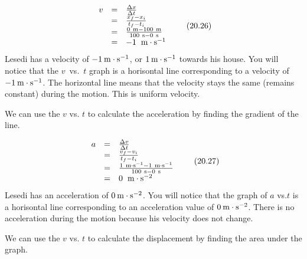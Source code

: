     \begin{equation}
    \begin{array}{ccc}\hfill v& =& \frac{\Delta x}{\Delta t}\hfill \\ & =& \frac{{x}_{f}-{x}_{i}}{{t}_{f}-{t}_{i}}\hfill \\ & =& \frac{0\phantom{\rule{3.33333pt}{0ex}}\mathrm{m}-100\phantom{\rule{3.33333pt}{0ex}}\mathrm{m}}{100\phantom{\rule{3.33333pt}{0ex}}\mathrm{s}-0\phantom{\rule{3.33333pt}{0ex}}\mathrm{s}}\hfill \\ & =& -1\phantom{\rule{4pt}{0ex}}\phantom{\rule{0.166667em}{0ex}}\mathrm{m}\ensuremath{\cdot}{\mathrm{s}}^{-1}\hfill \end{array}\tag{20.26}
      \end{equation}
        \label{m38795*id70472}Lesedi has a velocity of $-1\phantom{\rule{2pt}{0ex}}\mathrm{m}\ensuremath{\cdot}\mathrm{s}{}^{-1}$, or $1\phantom{\rule{2pt}{0ex}}\mathrm{m}\ensuremath{\cdot}\mathrm{s}{}^{-1}$ towards his house. You will notice that the $v$~vs.~$t$ graph is a horisontal line corresponding to a velocity of $-1\phantom{\rule{2pt}{0ex}}\mathrm{m}\ensuremath{\cdot}\mathrm{s}{}^{-1}$. The horizontal line means that the velocity stays the same (remains constant) during the motion. This is uniform velocity.\par 
        \label{m38795*id70573}We can use the $v$ vs. $t$ to calculate the acceleration by finding the gradient of the line.\par 
        \label{m38795*id70595}\nopagebreak\noindent{}
          
    \begin{equation}
    \begin{array}{ccc}\hfill a& =& \frac{\Delta v}{\Delta t}\hfill \\ & =& \frac{{v}_{f}-{v}_{i}}{{t}_{f}-{t}_{i}}\hfill \\ & =& \frac{1\phantom{\rule{3.33333pt}{0ex}}\mathrm{m}\ensuremath{\cdot}{\mathrm{s}}^{-1}-1\phantom{\rule{3.33333pt}{0ex}}\mathrm{m}\ensuremath{\cdot}{\mathrm{s}}^{-1}}{100\phantom{\rule{3.33333pt}{0ex}}\mathrm{s}-0\phantom{\rule{3.33333pt}{0ex}}\mathrm{s}}\hfill \\ & =& 0\phantom{\rule{4pt}{0ex}}\phantom{\rule{0.166667em}{0ex}}\mathrm{m}\ensuremath{\cdot}{\mathrm{s}}^{-2}\hfill \end{array}\tag{20.27}
      \end{equation}
        \label{m38795*id70807}Lesedi has an acceleration of $0\phantom{\rule{2pt}{0ex}}\mathrm{m}\ensuremath{\cdot}\mathrm{s}{}^{-2}$. You will notice that the graph of $a$ vs.$t$ is a horisontal line corresponding to an acceleration value of $0\phantom{\rule{2pt}{0ex}}\mathrm{m}\ensuremath{\cdot}\mathrm{s}{}^{-2}$. There is no acceleration during the motion because his velocity does not change.\par 
        \label{m38795*id70880}We can use the $v$ vs. $t$ to calculate the displacement by finding the area under the graph.\par 
        \label{m38795*id70902}\nopagebreak\noindent{}
          
